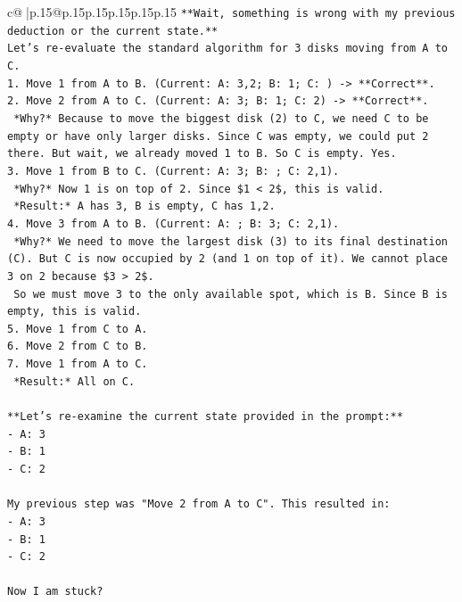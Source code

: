 \documentclass{article}
\begin{document}
{\begin{supertabular}{c@{$\;$}|p{.15\linewidth}@{}p{.15\linewidth}p{.15\linewidth}p{.15\linewidth}p{.15\linewidth}p{.15\linewidth}}
{{{\texttt{**Wait, something is wrong with my previous deduction or the current state.**} \\
\texttt{Let's re{-}evaluate the standard algorithm for 3 disks moving from A to C.} \\
\texttt{1. Move 1 from A to B. (Current: A: 3,2; B: 1; C: ) {-}> **Correct**.} \\
\texttt{2. Move 2 from A to C. (Current: A: 3; B: 1; C: 2) {-}> **Correct**.} \\
\texttt{   *Why?* Because to move the biggest disk (2) to C, we need C to be empty or have only larger disks. Since C was empty, we could put 2 there. But wait, we already moved 1 to B. So C is empty. Yes.} \\
\texttt{3. Move 1 from B to C. (Current: A: 3; B: ; C: 2,1).} \\
\texttt{   *Why?* Now 1 is on top of 2. Since \$1 < 2\$, this is valid.} \\
\texttt{   *Result:* A has 3, B is empty, C has 1,2.} \\
\texttt{4. Move 3 from A to B. (Current: A: ; B: 3; C: 2,1).} \\
\texttt{   *Why?* We need to move the largest disk (3) to its final destination (C). But C is now occupied by 2 (and 1 on top of it). We cannot place 3 on 2 because \$3 > 2\$.} \\
\texttt{   So we must move 3 to the only available spot, which is B. Since B is empty, this is valid.} \\
\texttt{5. Move 1 from C to A.} \\
\texttt{6. Move 2 from C to B.} \\
\texttt{7. Move 1 from A to C.} \\
\texttt{   *Result:* All on C.} \\
\\ 
\texttt{**Let's re{-}examine the current state provided in the prompt:**} \\
\texttt{{-} A: 3} \\
\texttt{{-} B: 1} \\
\texttt{{-} C: 2} \\
\\ 
\texttt{My previous step was "Move 2 from A to C". This resulted in:} \\
\texttt{{-} A: 3} \\
\texttt{{-} B: 1} \\
\texttt{{-} C: 2} \\
\\ 
\texttt{Now I am stuck?} \\
}}}
\end{supertabular}}
\end{document}
